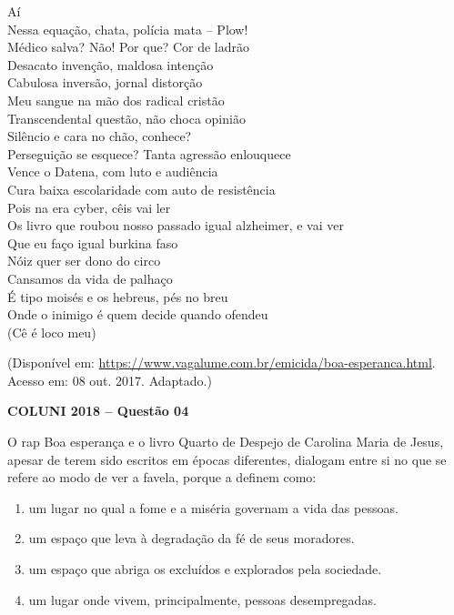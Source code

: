 \noindent
Aí\\
Nessa equação, chata, polícia mata -- Plow!\\
Médico salva? Não! Por que? Cor de ladrão\\
Desacato invenção, maldosa intenção\\
Cabulosa inversão, jornal distorção\\
Meu sangue na mão dos radical cristão\\
Transcendental questão, não choca opinião\\
Silêncio e cara no chão, conhece?\\
Perseguição se esquece? Tanta agressão enlouquece\\
Vence o Datena, com luto e audiência\\
Cura baixa escolaridade com auto de resistência\\
Pois na era cyber, cêis vai ler\\
Os livro que roubou nosso passado igual alzheimer, e vai ver\\
Que eu faço igual burkina faso\\
Nóiz quer ser dono do circo\\
Cansamos da vida de palhaço\\
É tipo moisés e os hebreus, pés no breu\\
Onde o inimigo é quem decide quando ofendeu\\
(Cê é loco meu)\\
[...]

\vspace{0.3cm}

\begin{center}
\footnotesize
(Disponível em: \url{https://www.vagalume.com.br/emicida/boa-esperanca.html}.
Acesso em: 08 out. 2017. Adaptado.)
\end{center}

\textbf{COLUNI 2018 -- Questão 04}\par\medskip O rap Boa esperança e o livro Quarto de Despejo de Carolina Maria de Jesus, apesar de terem sido escritos em épocas diferentes, dialogam entre si no que se refere ao modo de ver a favela, porque a definem como:\begin{enumerate}
\item um lugar no qual a fome e a miséria governam a vida das pessoas.
\item um espaço que leva à degradação da fé de seus moradores.
\item um espaço que abriga os excluídos e explorados pela sociedade.
\item um lugar onde vivem, principalmente, pessoas desempregadas.\end{enumerate}
